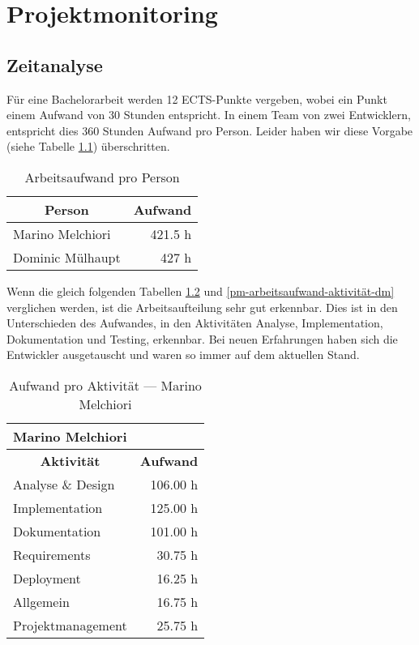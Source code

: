 \chapter{Projektmonitoring}
\label{pm-projektmonitoring}

\section{Zeitanalyse}
Für eine Bachelorarbeit werden 12 ECTS-Punkte vergeben, wobei ein Punkt einem Aufwand von 30 Stunden entspricht.
In einem Team von zwei Entwicklern, entspricht dies 360 Stunden Aufwand pro Person. 
Leider haben wir diese Vorgabe (siehe Tabelle \ref{pm-arbeitsaufwand}) überschritten. 

\begin{table}[H]
\centering
\begin{tabular}{|l|r|}
\hline 
\multicolumn{1}{|c|}{\textbf{Person}} & \multicolumn{1}{|c|}{\textbf{Aufwand}} \\
\hline 
Marino Melchiori & 421.5 h \\
\hline 
Dominic Mülhaupt & 427 h \\  
\hline 
\end{tabular}
\caption{Arbeitsaufwand pro Person}
\label{pm-arbeitsaufwand}
\end{table}

Wenn die gleich folgenden Tabellen \ref{pm-arbeitsaufwand-aktivität-mm} und \ref{pm-arbeitsaufwand-aktivität-dm} verglichen werden, ist die Arbeitsaufteilung sehr gut erkennbar. 
Dies ist in den Unterschieden des Aufwandes, in den Aktivitäten Analyse, Implementation, Dokumentation und Testing, erkennbar. 
Bei neuen Erfahrungen haben sich die Entwickler ausgetauscht und waren so immer auf dem aktuellen Stand. 

\begin{table}[H]
\centering
\label{pm-arbeitsaufwand-aktivität-mm}
\begin{tabular}{|l|r|}
\hline
\multicolumn{2}{|l|}{\textbf{Marino Melchiori}} \\
\hline
\multicolumn{1}{|c|}{\textbf{Aktivität}} & \multicolumn{1}{|c|}{\textbf{Aufwand}} \\
\hline
Analyse \& Design & 106.00 h \\
\hline
Implementation & 125.00 h \\
\hline
Dokumentation & 101.00 h \\
\hline
Requirements & 30.75 h \\
\hline
Deployment & 16.25 h \\
\hline
Allgemein & 16.75 h \\
\hline
Projektmanagement & 25.75 h \\
\hline
\end{tabular}
\caption{Aufwand pro Aktivität --- Marino Melchiori}
\end{table}


